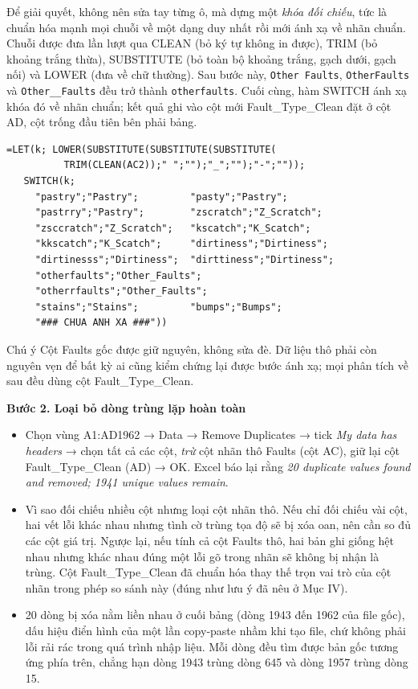 \documentclass[12pt]{article}
\begin{document}
\noindent Để giải quyết, không nên sửa tay từng ô, mà dựng một \emph{khóa đối chiếu}, tức là chuẩn hóa mạnh mọi chuỗi về một dạng duy nhất rồi mới ánh xạ về nhãn chuẩn. Chuỗi được đưa lần lượt qua CLEAN (bỏ ký tự không in được), TRIM (bỏ khoảng trắng thừa), SUBSTITUTE (bỏ toàn bộ khoảng trắng, gạch dưới, gạch nối) và LOWER (đưa về chữ thường). Sau bước này, \texttt{Other Faults}, \texttt{OtherFaults} và \texttt{Other\_\_Faults} đều trở thành \texttt{otherfaults}. Cuối cùng, hàm SWITCH ánh xạ khóa đó về nhãn chuẩn; kết quả ghi vào cột mới Fault\_Type\_Clean đặt ở cột AD, cột trống đầu tiên bên phải bảng.

\begin{aivncodebox}
\begin{lstlisting}[language=Excel]
=LET(k; LOWER(SUBSTITUTE(SUBSTITUTE(SUBSTITUTE(
          TRIM(CLEAN(AC2));" ";"");"_";"");"-";""));
   SWITCH(k;
     "pastry";"Pastry";         "pasty";"Pastry";
     "pastrry";"Pastry";        "zscratch";"Z_Scratch";
     "zsccratch";"Z_Scratch";   "kscatch";"K_Scatch";
     "kkscatch";"K_Scatch";     "dirtiness";"Dirtiness";
     "dirtinesss";"Dirtiness";  "dirttiness";"Dirtiness";
     "otherfaults";"Other_Faults";
     "otherrfaults";"Other_Faults";
     "stains";"Stains";         "bumps";"Bumps";
     "### CHUA ANH XA ###"))\end{lstlisting}
\end{aivncodebox}

\begin{guidelinebox}{Chú ý}
Cột Faults gốc được giữ nguyên, không sửa đè. Dữ liệu thô phải còn nguyên vẹn để bất kỳ ai cũng kiểm chứng lại được bước ánh xạ; mọi phân tích về sau đều dùng cột Fault\_Type\_Clean.
\end{guidelinebox}

\textbf{Bước 2. Loại bỏ dòng trùng lặp hoàn toàn}
\begin{itemize}
  \item Chọn vùng A1:AD1962 → Data → Remove Duplicates → tick \emph{My data has headers} → chọn tất cả các cột, \emph{trừ} cột nhãn thô Faults (cột AC), giữ lại cột Fault\_Type\_Clean (AD) → OK. Excel báo lại rằng \emph{20 duplicate values found and removed; 1941 unique values remain}.
  \item Vì sao đối chiếu nhiều cột nhưng loại cột nhãn thô. Nếu chỉ đối chiếu vài cột, hai vết lỗi khác nhau nhưng tình cờ trùng tọa độ sẽ bị xóa oan, nên cần so đủ các cột giá trị. Ngược lại, nếu tính cả cột Faults thô, hai bản ghi giống hệt nhau nhưng khác nhau đúng một lỗi gõ trong nhãn sẽ không bị nhận là trùng. Cột Fault\_Type\_Clean đã chuẩn hóa thay thế trọn vai trò của cột nhãn trong phép so sánh này (đúng như lưu ý đã nêu ở Mục IV).
  \item 20 dòng bị xóa nằm liền nhau ở cuối bảng (dòng 1943 đến 1962 của file gốc), dấu hiệu điển hình của một lần copy-paste nhầm khi tạo file, chứ không phải lỗi rải rác trong quá trình nhập liệu. Mỗi dòng đều tìm được bản gốc tương ứng phía trên, chẳng hạn dòng 1943 trùng dòng 645 và dòng 1957 trùng dòng 15.
\end{itemize}
\end{document}
